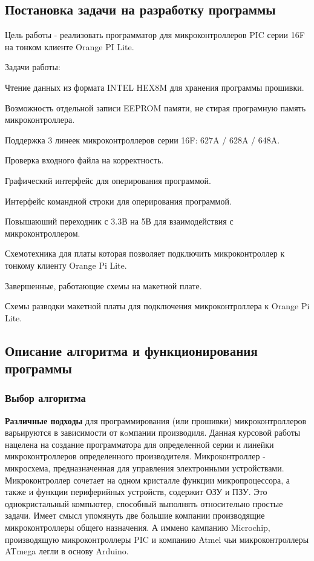 \subsection{Постановка задачи на разработку программы}
    Цель работы - реализовать программатор для микроконтроллеров PIC серии 16F на тонком клиенте Orange PI Lite.

\bigskip
Задачи работы:

\smallskip
\begin{my_enumerate}
\item Чтение данных из формата INTEL HEX8M для хранения программы прошивки.
\item Возможность отдельной записи EEPROM памяти, не стирая програмную память микроконтроллера.
\item Поддержка 3 линеек микроконтроллеров серии 16F: 627A / 628A / 648A.
\item Проверка входного файла на корректность.
\item Графический интерфейс для оперирования программой.
\item Интерфейс командной строки для оперирования программой.
\item Повышаюший переходник с 3.3В на 5В для взаимодействия с микроконтроллером.
\item Схемотехника для платы которая позволяет подключить микроконтроллер к тонкому клиенту Orange Pi Lite.
\item Завершенные, работающие схемы на макетной плате.
\item Схемы разводки макетной платы для подключения микроконтроллера к Orange Pi Lite. 
\end{my_enumerate}


\subsection{Описание алгоритма и функционирования программы}


\subsubsection{Выбор алгоритма}

\textbf{Различные подходы}
для программирования (или прошивки) микроконтроллеров варьируются в зависимости от кoмпании производиля. 
Данная курсовой работы нацелена на создание программатора для определенной серии и линейки микроконтроллеров определенного производителя. Микроконтроллер - микросхема, предназначенная для управления электронными устройствами. Микроконтроллер сочетает на одном кристалле функции микропроцессора, а также и функции периферийных устройств, содержит ОЗУ и ПЗУ. Это однокристальный компьютер, способный выполнять относительно простые задачи.
Имеет смысл упомянуть две большие компании производящие микроконтроллеры общего назначения. А иммено кампанию Microchip, производящую микроконтроллеры PIC и компанию Atmel чьи микроконтроллеры ATmega легли в основу Arduino.

